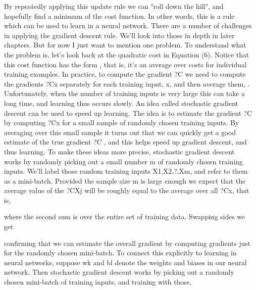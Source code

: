 By repeatedly applying this update rule we can "roll down the hill", and hopefully find a minimum of the cost function. In other words, this is a rule which can be used to learn in a neural network.
There are a number of challenges in applying the gradient descent rule. We'll look into those in depth in later chapters. But for now I just want to mention one problem. To understand what the problem is, let's look back at the quadratic cost in Equation (6). Notice that this cost function has the form , that is, it's an average over costs  for individual training examples. In practice, to compute the gradient ?C we need to compute the gradients ?Cx separately for each training input, x, and then average them, . Unfortunately, when the number of training inputs is very large this can take a long time, and learning thus occurs slowly.
An idea called stochastic gradient descent can be used to speed up learning. The idea is to estimate the gradient ?C by computing ?Cx for a small sample of randomly chosen training inputs. By averaging over this small sample it turns out that we can quickly get a good estimate of the true gradient ?C , and this helps speed up gradient descent, and thus learning.
To make these ideas more precise, stochastic gradient descent works by randomly picking out a small number m of randomly chosen training inputs. We'll label those random training inputs X1,X2,?,Xm, and refer to them as a mini-batch. Provided the sample size m is large enough we expect that the average value of the ?CXj will be roughly equal to the average over all ?Cx, that is, 

where the second sum is over the entire set of training data. Swapping sides we get 

confirming that we can estimate the overall gradient by computing gradients just for the randomly chosen mini-batch. 
To connect this explicitly to learning in neural networks, suppose wk and bl denote the weights and biases in our neural network. Then stochastic gradient descent works by picking out a randomly chosen mini-batch of training inputs, and training with those, 

